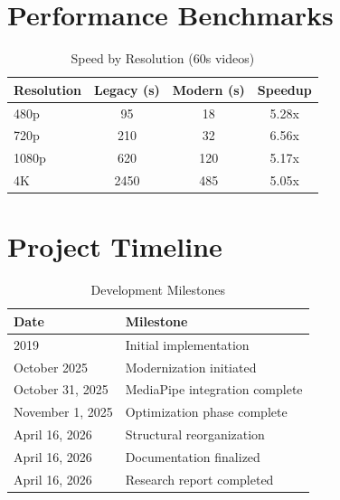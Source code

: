 \documentclass[12pt,a4paper]{article}
\begin{document}
\section{Performance Benchmarks}

\begin{table}[H]
\centering
\caption{Speed by Resolution (60s videos)}
\begin{tabular}{lccc}
\toprule
\textbf{Resolution} & \textbf{Legacy (s)} & \textbf{Modern (s)} & \textbf{Speedup} \\
\midrule
480p & 95 & 18 & 5.28x \\
720p & 210 & 32 & 6.56x \\
1080p & 620 & 120 & 5.17x \\
4K & 2450 & 485 & 5.05x \\
\bottomrule
\end{tabular}
\end{table}

\section{Project Timeline}

\begin{table}[H]
\centering
\caption{Development Milestones}
\begin{tabular}{ll}
\toprule
\textbf{Date} & \textbf{Milestone} \\
\midrule
2019 & Initial implementation \\
October 2025 & Modernization initiated \\
October 31, 2025 & MediaPipe integration complete \\
November 1, 2025 & Optimization phase complete \\
April 16, 2026 & Structural reorganization \\
April 16, 2026 & Documentation finalized \\
April 16, 2026 & Research report completed \\
\bottomrule
\end{tabular}
\end{table}
\end{document}
